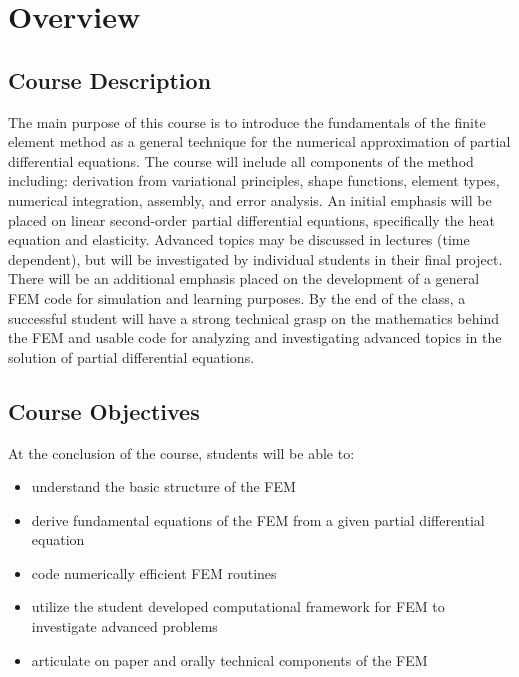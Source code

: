 \documentclass[12pt,letterpaper]{article}
\begin{document}
\section{Overview}
\subsection*{Course Description}
The main purpose of this course is to introduce the fundamentals of the finite element method as a general technique for the numerical approximation of partial differential equations.
The course will include all components of the method including: derivation from variational principles, shape functions, element types, numerical integration, assembly, and error analysis.
An initial emphasis will be placed on linear second-order partial differential equations, specifically the heat equation and elasticity.
Advanced topics may be discussed in lectures (time dependent), but will be investigated by individual students in their final project.
There will be an additional emphasis placed on the development of a general FEM code for simulation and learning purposes.
By the end of the class, a successful student will have a strong technical grasp on the mathematics behind the FEM and usable code for analyzing and investigating advanced topics in the solution of partial differential equations.

\subsection*{Course Objectives}
At the conclusion of the course, students will be able to:
\begin{itemize}
 \item understand the basic structure of the FEM
 \item derive fundamental equations of the FEM from a given partial differential equation
 \item code numerically efficient FEM routines
 \item utilize the student developed computational framework for FEM to investigate advanced problems
 \item articulate on paper and orally technical components of the FEM
\end{itemize}
\end{document}
